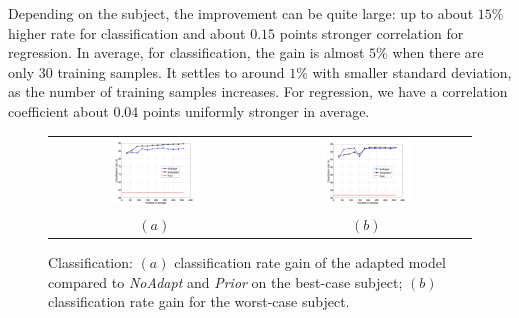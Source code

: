 Depending on the subject, the improvement can be quite large: up to
about $15\%$ higher rate for classification and about $0.15$ points stronger
correlation for regression. In average, for classification, the gain is
almost $5\%$ when there are only $30$ training samples. It settles
to around $1\%$ with smaller standard deviation, as the number of
training samples increases. For regression, we have a correlation
coefficient about $0.04$ points uniformly stronger in average.

\begin{figure}[!ht] \centering
  \begin{tabular}{cc}
    \includegraphics[width=0.45\textwidth]{figs/exp1_abs_best} &
    \includegraphics[width=0.45\textwidth]{figs/exp1_abs_worst} \\
    $(a)$ & $(b)$ \\
  \end{tabular}
  \caption{Classification: $(a)$ classification rate gain
    of the adapted model compared to \emph{NoAdapt} and \emph{Prior}
    on the best-case subject; $(b)$ classification rate gain for
    the worst-case subject.}
  \label{fig:cla_abs}
\end{figure}

